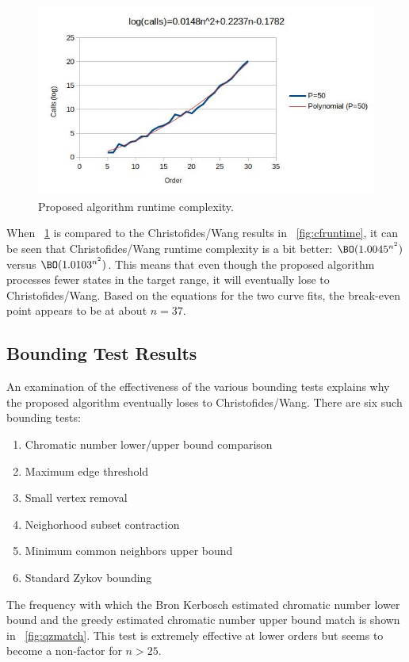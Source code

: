 \begin{figure}[H]
  \centering
  \includegraphics[width=5in]{qz_runtime}
  \caption{Proposed algorithm runtime complexity.}
  \label{fig:qzruntime}
\end{figure}

When \figurename~\ref{fig:qzruntime} is compared to the Christofides/Wang results in
\figurename~\ref{fig:cfruntime}, it can be seen that Christofides/Wang runtime complexity is a bit better:
\(\BO(1.0045^{n^2})\) versus \(\BO(1.0103^{n^2})\).  This means that even though the proposed algorithm processes
fewer states in the target range, it will eventually lose to Christofides/Wang.  Based on the equations for the
two curve fits, the break-even point appears to be at about \(n=37\).

\subsection{Bounding Test Results}\label{sec:sub:bounding}

An examination of the effectiveness of the various bounding tests explains why the proposed algorithm eventually
loses to Christofides/Wang.  There are six such bounding tests:
\begin{enumerate}
\item Chromatic number lower/upper bound comparison
\item Maximum edge threshold
\item Small vertex removal
\item Neighorhood subset contraction
\item Minimum common neighbors upper bound
\item Standard Zykov bounding
\end{enumerate}

The frequency with which the Bron Kerbosch estimated chromatic number lower bound and the greedy estimated chromatic
number upper bound match is shown in \figurename~\ref{fig:qzmatch}.  This test is extremely effective at lower orders
but seems to become a non-factor for \(n>25\).

